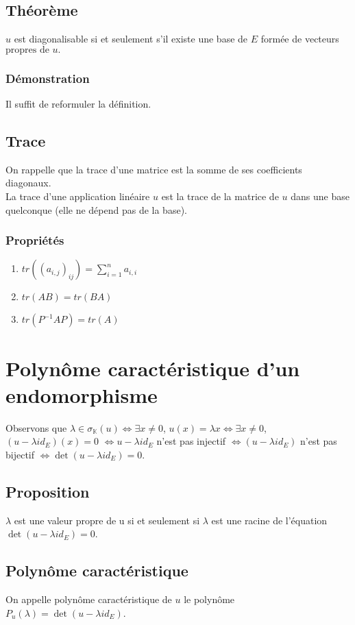 \documentclass[a4paper,10pt]{book} %
\newcommand{\K}{\mathbb{K}}
\begin{document}
\subsection{Théorème}
$u$ est diagonalisable si et seulement s'il existe une base de $E$ formée de vecteurs $\text{propres de }u.$

\subsubsection{Démonstration}
Il suffit de reformuler la définition.

\subsection{Trace}
On rappelle que la trace d'une matrice est la somme de ses coefficients diagonaux.\\

La trace d'une application linéaire $u$ est la trace de la matrice de $u$ dans une base quelconque (elle ne dépend pas de la base).

\subsubsection{Propriétés}
\begin{enumerate}
\item $tr((a_{i,j})_{ij})=\sum_{i=1}^n a_{i,i}$
\item $tr(AB)=tr(BA)$
\item $tr(P^{-1}AP)=tr(A)$
\end{enumerate}
\section{Polynôme caractéristique d'un endomorphisme}
Observons que $\lambda\in \sigma_\K(u)\Leftrightarrow \exists x\neq 0$, $u(x)=\lambda x \Leftrightarrow \exists x\neq 0$, $(u-\lambda id_E)(x)=0$ $\Leftrightarrow u-\lambda id_E$ n'est pas injectif $\Leftrightarrow(u-\lambda id_E)$ n'est pas bijectif $\Leftrightarrow \det(u-\lambda id_E)=0$.

\subsection{Proposition}
$\lambda$ est une valeur propre de u si et seulement si $\lambda$ est une racine de l'équation $\det(u-\lambda id_E)=0$.

\subsection{Polynôme caractéristique}
On appelle polynôme caractéristique de $u$ le polynôme $P_u(\lambda)=\det(u-\lambda id_E)$.\\
\end{document}
